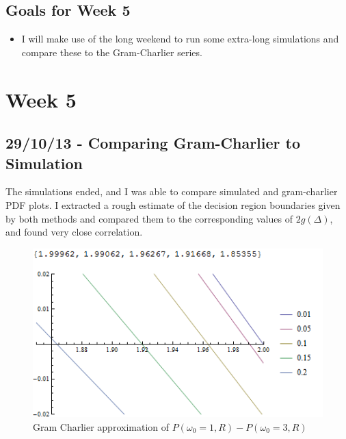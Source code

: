 \subsection{Goals for Week 5}

\begin{itemize}
\itemsep1pt\parskip0pt
\item
  I will make use of the long weekend to run some extra-long simulations
  and compare these to the Gram-Charlier series.
\end{itemize}

\section{Week 5}

\subsection{29/10/13 - Comparing Gram-Charlier to Simulation}

The simulations ended, and I was able to compare simulated and
gram-charlier PDF plots. I extracted a rough estimate of the decision
region boundaries given by both methods and compared them to the
corresponding values of $2 g(\Delta)$, and found very close correlation.

\begin{figure}[htbp]
\centering
\includegraphics[width=\linewidth]{../../../plots/gcdrb.png}
\caption{Gram Charlier approximation of
$P(\omega_0=1,R)-P(\omega_0=3,R)$}
\end{figure}

